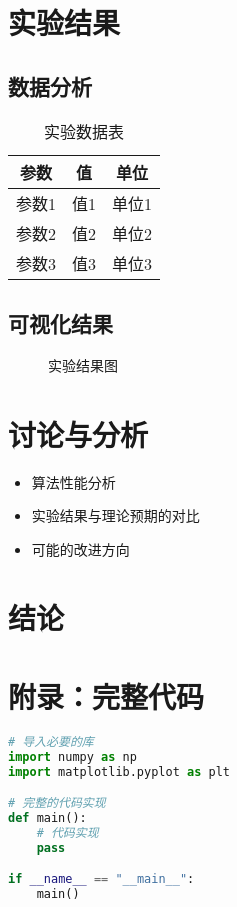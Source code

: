 \documentclass[letterpaper,12pt]{article}
\begin{document}
\section{实验结果}

\subsection{数据分析}

\begin{table}[h]
    \centering
    \caption{实验数据表}
    \begin{tabular}{@{}ccc@{}}
    \toprule
    参数 & 值 & 单位 \\
    \midrule
    参数1 & 值1 & 单位1 \\
    参数2 & 值2 & 单位2 \\
    参数3 & 值3 & 单位3 \\
    \bottomrule
    \end{tabular}
\end{table}

\subsection{可视化结果}
\begin{figure}[h]
    \centering
    \caption{实验结果图}
    \label{fig:result}
\end{figure}

\section{讨论与分析}
\begin{itemize}
    \item 算法性能分析
    \item 实验结果与理论预期的对比
    \item 可能的改进方向
\end{itemize}

\section{结论}

\appendix %
\section{附录：完整代码}
\begin{lstlisting}[language=Python, caption=完整代码]
# 导入必要的库
import numpy as np
import matplotlib.pyplot as plt

# 完整的代码实现
def main():
    # 代码实现
    pass

if __name__ == "__main__":
    main()
\end{lstlisting}
\end{document}
